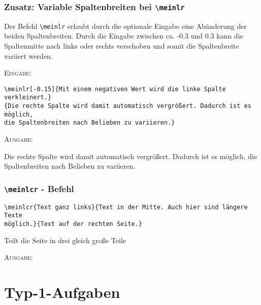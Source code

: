 \documentclass[a4paper,12pt]{article}
\begin{document}


\subsubsection*{Zusatz: Variable Spaltenbreiten bei \texttt{\textbackslash meinlr}}

Der Befehl \texttt{\textbackslash meinlr} erlaubt durch die optionale Eingabe eine Abänderung der beiden Spaltenbreiten. Durch die Eingabe zwischen ca. -0.3 und 0.3 kann die Spaltenmitte nach links oder rechts verschoben und somit die Spaltenbreite variiert werden.

\textsc{Eingabe:}

\begin{verbatim}
\meinlr[-0.15]{Mit einem negativen Wert wird die linke Spalte verkleinert.}
{Die rechte Spalte wird damit automatisch vergrößert. Dadurch ist es möglich, 
die Spaltenbreiten nach Belieben zu variieren.}
\end{verbatim}

\textsc{Ausgabe:}

{Die rechte Spalte wird damit automatisch vergrößert. Dadurch ist es möglich, 
die Spaltenbreiten nach Belieben zu variieren.}

\leer

\subsubsection*{\texttt{\textbackslash meinlcr} - Befehl}
\begin{verbatim}
\meinlcr{Text ganz links}{Text in der Mitte. Auch hier sind längere Texte
möglich.}{Text auf der rechten Seite.}
\end{verbatim}
Teilt die Seite in drei gleich große Teile

\leer

\textsc{Ausgabe:}


\leer


\section{Typ-1-Aufgaben}
\end{document}
